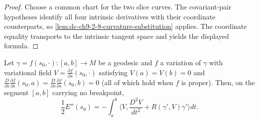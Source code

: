 \begin{proof}

  \sketch
  Choose a common chart for the two slice curves. The covariant-pair hypotheses
  identify all four intrinsic derivatives with their coordinate counterparts, so
  \cref{lem:dc-ch9-2-8-curvature-substitution} applies. The coordinate equality
  transports to the intrinsic tangent space and yields the displayed formula.
\end{proof}
\begin{lemma}
  \label{lem:dc-ch9-2-8-segment}


  Let $\gamma=f(s_0,\cdot):[a,b]\to M$ be a geodesic and $f$ a variation of $\gamma$ with
  variational field $V=\frac{\partial f}{\partial s}(s_0,\cdot)$ satisfying $V(a)=V(b)=0$ and
  $\frac{D}{\partial s}\frac{\partial f}{\partial s}(s_0,a)
    =\frac{D}{\partial s}\frac{\partial f}{\partial s}(s_0,b)=0$ (all of which hold when $f$ is
  proper). Then, on the segment $[a,b]$ carrying no breakpoint,
  $$
  \frac{1}{2}E''(s_0)=-\int_a^b\Big\langle V,\frac{D^2 V}{dt^2}+R(\gamma',V)\gamma'\Big\rangle dt .
  $$

\end{lemma}
